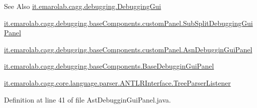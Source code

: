 \begin{DoxySeeAlso}{See Also}
\hyperlink{classit_1_1emarolab_1_1cagg_1_1debugging_1_1DebuggingGui}{it.\-emarolab.\-cagg.\-debugging.\-Debugging\-Gui} 

\hyperlink{classit_1_1emarolab_1_1cagg_1_1debugging_1_1baseComponents_1_1customPanel_1_1SubSplitDebuggingGuiPanel}{it.\-emarolab.\-cagg.\-debugging.\-base\-Components.\-custom\-Panel.\-Sub\-Split\-Debugging\-Gui\-Panel} 

\hyperlink{classit_1_1emarolab_1_1cagg_1_1debugging_1_1baseComponents_1_1customPanel_1_1AsnDebugginGuiPanel}{it.\-emarolab.\-cagg.\-debugging.\-base\-Components.\-custom\-Panel.\-Asn\-Debuggin\-Gui\-Panel} 

\hyperlink{classit_1_1emarolab_1_1cagg_1_1debugging_1_1baseComponents_1_1BaseDebugginGuiPanel}{it.\-emarolab.\-cagg.\-debugging.\-base\-Components.\-Base\-Debuggin\-Gui\-Panel} 

\hyperlink{classit_1_1emarolab_1_1cagg_1_1core_1_1language_1_1parser_1_1ANTLRInterface_1_1TreeParserListener}{it.\-emarolab.\-cagg.\-core.\-language.\-parser.\-A\-N\-T\-L\-R\-Interface.\-Tree\-Parser\-Listener} 
\end{DoxySeeAlso}


Definition at line 41 of file Ast\-Debuggin\-Gui\-Panel.\-java.



